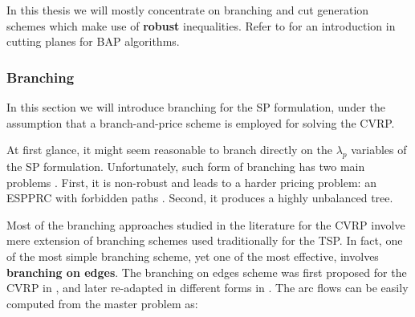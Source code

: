 In this thesis
we will mostly concentrate on branching and cut generation schemes
which make use of \textbf{robust} inequalities.
Refer to \textcite{desaulniers2011} for an introduction in cutting planes for BAP algorithms.

\begin{comment}
\textcite{lubbecke2005}
The purpose of the RMP (as is the purpose of subgradient algorithms in Lagrangian relaxation) is to
provide dual variables: To be transferred to the subproblem, and to control our stopping criterion. In
the end only, we have to recover from the RMP a primal feasible solution to the compact formulation.
Primal methods, like column generation, maintain primal feasibility and work towards dual feasi-
bility. It is therefore only natural to monitor the dual solution in the course of the algorithm. In our
opinion, the dual point of view reveals most valuable insight into the algorithm’s functioning. We call
the polyhedron associated with the dual of the RMP the dual polyhedron. A dual solution to the RMP
needs not be unique, e.g., if the primal is degenerate. This is significant inasmuch the dual solution di-
rectly influences the selection of new columns. Since a dual basic solution corresponds to an extreme
point of the optimal face, it may be a bad representative of all the dual solutions obtainable.
\end{comment}

\subsubsection{Branching}
\label{sec:bap-branching}

In this section we will introduce branching for the SP formulation,
under the assumption that a branch-and-price scheme is employed
for solving the CVRP.

At first glance,
it might seem reasonable to branch directly on the $\lambda_p$ variables of the SP formulation.
Unfortunately, such form of branching has two main problems \parencite{vanderbeck2010reformulation}.
First, it is non-robust and leads to a harder pricing problem: an ESPPRC with forbidden paths \parencite{villeneuve2005}.
Second, it produces a highly unbalanced tree.

Most of the branching approaches studied in the literature for the CVRP involve
mere extension of branching schemes used traditionally for the TSP.
In fact, one of the most simple branching scheme,
yet one of the most effective,
involves \textbf{branching on edges}.
The branching on edges scheme was first proposed for the CVRP in \textcite{christofides1969},
and later re-adapted in different forms in \textcite{fisher1994, miller1995}.
The arc flows can be easily computed from the master problem as:


